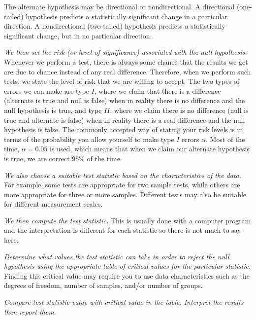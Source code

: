 The alternate hypothesis may be directional or nondirectional. A directional (one-tailed) hypothesis predicts a statistically significant change in a particular direction. A nondirectional (two-tailed) hypothesis predicts a statistically significant change, but in no particular direction.

\textit{We then set the risk (or level of significance) associated with the null hypothesis.} Whenever we perform a test, there is always some chance that the results we get are due to chance instead of any real difference. Therefore, when we perform such tests, we state the level of risk that we are willing to accept. The two types of errors we can make are type $I$, where we claim that there is a difference (alternate is true and null is false) when in reality there is no difference and the null hypothesis is true, and type $II$, where we claim there is no difference (null is true and alternate is false) when in reality there is a real difference and the null hypothesis is false. The commonly accepted way of stating your risk levels is in terms of the probability you allow yourself to make type $I$ errors $\alpha$. Most of the time, $\alpha = 0.05$ is used, which means that when we claim our alternate hypothesis is true, we are correct $95\%$ of the time.

\textit{We also choose a suitable test statistic based on the characteristics of the data.} For example, some tests are appropriate for two sample tests, while others are more appropriate for three or more samples. Different tests may also be suitable for different measurement scales. 

\textit{We then compute the test statistic.} This is usually done with a computer program and the interpretation is different for each statistic so there is not much to say here.

\textit{Determine what values the test statistic can take in order to reject the null hypothesis using the appropriate table of critical values for the particular statistic.} Finding this critical value may require you to use data characteristics such as the degrees of freedom, number of samples, and/or number of groups.

\textit{Compare test statistic value with critical value in the table. Interpret the results then report them.}